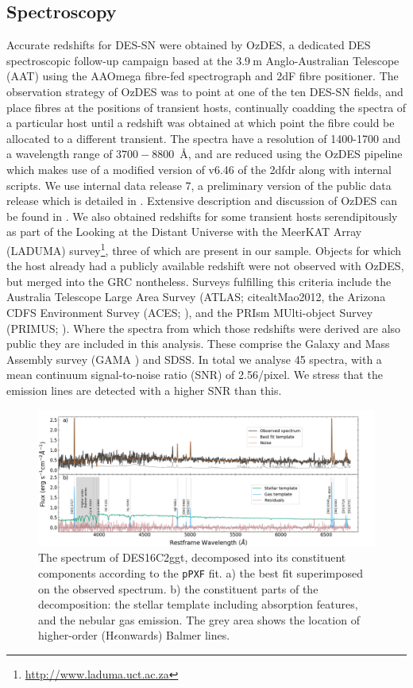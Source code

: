 \documentclass[fleqn,usenatbib,]{mnras}
\newcommand{\hepsilon}[0]{H$\epsilon$}
\begin{document}
\subsection{Spectroscopy \label{subsec:spec}}
Accurate redshifts for DES-SN were obtained by OzDES, a dedicated DES spectroscopic follow-up campaign based at the $3.9~\textrm{m}$ Anglo-Australian Telescope (AAT) using the AAOmega fibre-fed spectrograph and 2dF fibre positioner. The observation strategy of OzDES was to point at one of the ten DES-SN fields, and place fibres at the positions of transient hosts, continually coadding the spectra of a particular host until a redshift was obtained at which point the fibre could be allocated to a different transient. The spectra have a resolution of 1400-1700 and a wavelength range of $3700 -8800$~\AA, and are reduced using the OzDES pipeline which makes use of a modified version of v6.46 of the 2dfdr \citep{Croom2004} along with internal scripts. We use internal data release 7, a preliminary version of the public data release which is detailed in \citet{Lidman2020}. Extensive description and discussion of OzDES can be found in \citet{Yuan2015,Childress2017,Lidman2020}. We also obtained redshifts for some transient hosts serendipitously as part of the Looking at the Distant Universe with the MeerKAT Array (LADUMA) survey\footnote{\url{http://www.laduma.uct.ac.za}}, three of which are present in our sample.
Objects for which the host already had a publicly available redshift were not observed with OzDES, but merged into the GRC nontheless. Surveys fulfilling this criteria include the Australia Telescope Large Area Survey (ATLAS; 
citealt{Mao2012}, the Arizona CDFS Environment Survey (ACES; \citealt{Cooper2012}), and the PRIsm MUlti-object Survey (PRIMUS; \citealt{Coil2011,Cool2013}). Where the spectra from which those redshifts were derived are also public they are included in this analysis. These comprise the Galaxy and Mass Assembly survey (GAMA \citealt{Driver2009,Baldry2018}) and SDSS. In total we analyse 45 spectra, with a mean continuum signal-to-noise ratio (SNR) of 2.56/pixel. We stress that the emission lines are detected with a higher SNR than this.

\begin{figure}
\includegraphics[width=\textwidth]{figs/gal_spec.png}
\caption{The spectrum of DES16C2ggt, decomposed into its constituent components according to the \texttt{pPXF} fit. a) the best fit superimposed on the observed spectrum. b) the constituent parts of the decomposition: the stellar template including absorption features, and the nebular gas emission. The grey area shows the location of higher-order (\hepsilon onwards) Balmer lines.
\label{fig:host_spec}}
\end{figure}
\end{document}
